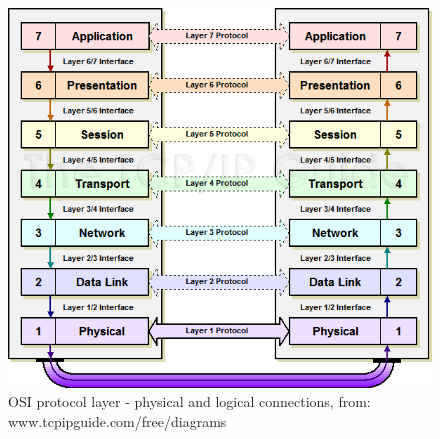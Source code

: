 \documentclass[a4paper,12pt]{article}
\begin{document}
	\begin{figure}[h!] 
		\begin{center}
			\includegraphics[width=0.8\linewidth]{OSIprotocols.png} 
			\caption{OSI protocol layer - physical and logical connections, from: www.tcpipguide.com/free/diagrams}
		\end{center}	
	\end{figure}
	
\end{document}
